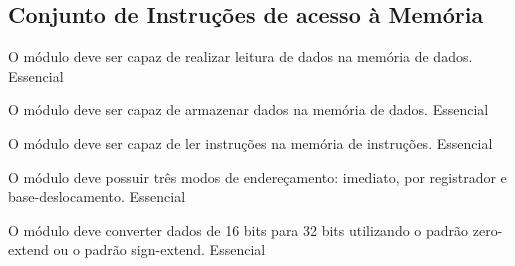 \subsection{Conjunto de Instruções de acesso à Memória}

	  \begin{functional}
		{O módulo deve ser capaz de realizar leitura de dados na memória de dados.}
		{Essencial}
		
		{O módulo deve ser capaz de armazenar dados na memória de dados.}
		{Essencial}
		
		{O módulo deve ser capaz de ler instruções na memória de instruções.}
		{Essencial}
                
        {O módulo deve possuir três modos de endereçamento: imediato, por registrador e base-deslocamento.}
        {Essencial}

		{O módulo deve converter dados de 16 bits para 32 bits utilizando o padrão zero-extend ou o padrão sign-extend.}
		{Essencial}
		 
	 \end{functional}
